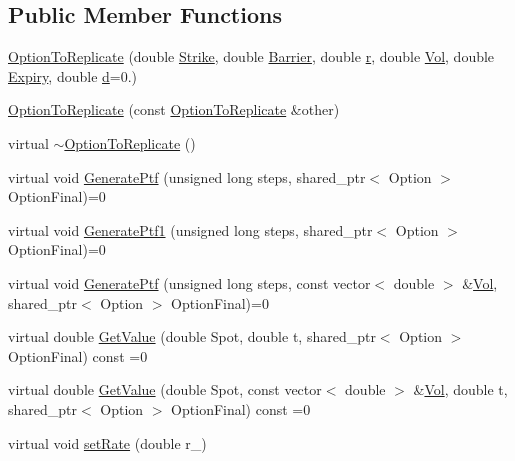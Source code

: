 \subsection*{Public Member Functions}
\begin{DoxyCompactItemize}
\item 
\hyperlink{classOptionToReplicate_a0fd76dc048a75371e306275fdd5a2aa5}{Option\+To\+Replicate} (double \hyperlink{classOptionToReplicate_a64ffcbc25fc60c5dc18ca4b78194ca89}{Strike}, double \hyperlink{classOptionToReplicate_a7cd35379de855ad6e53008fbf7e9dda0}{Barrier}, double \hyperlink{classOptionToReplicate_ad344ef3a4a4e93372c390c60420d1a61}{r}, double \hyperlink{classOptionToReplicate_a3a28b1ab0cd1ee635b3c31998bd2c572}{Vol}, double \hyperlink{classOptionToReplicate_a62014eac88a2a766ed674be69e9fd926}{Expiry}, double \hyperlink{classOptionToReplicate_aa088a512c974dc622ca1bbca61ec5e34}{d}=0.)
\item 
\hyperlink{classOptionToReplicate_a94d108f85fbd72b41d68f5e22061d0c5}{Option\+To\+Replicate} (const \hyperlink{classOptionToReplicate}{Option\+To\+Replicate} \&other)
\item 
virtual \hyperlink{classOptionToReplicate_a215ec3a4ce1dd20524ee87c663e8ed74}{$\sim$\+Option\+To\+Replicate} ()
\item 
virtual void \hyperlink{classOptionToReplicate_ae744ce948286546566cd424eaa7ea5cb}{Generate\+Ptf} (unsigned long steps, shared\+\_\+ptr$<$ Option $>$ Option\+Final)=0
\item 
virtual void \hyperlink{classOptionToReplicate_ad3315e5766faa9be46fa690d8d358b9d}{Generate\+Ptf1} (unsigned long steps, shared\+\_\+ptr$<$ Option $>$ Option\+Final)=0
\item 
virtual void \hyperlink{classOptionToReplicate_a47ad183412648a70cd77957383eb421f}{Generate\+Ptf} (unsigned long steps, const vector$<$ double $>$ \&\hyperlink{classOptionToReplicate_a3a28b1ab0cd1ee635b3c31998bd2c572}{Vol}, shared\+\_\+ptr$<$ Option $>$ Option\+Final)=0
\item 
virtual double \hyperlink{classOptionToReplicate_a7f39f64594b4baffb45d61a65b38c6b2}{Get\+Value} (double Spot, double t, shared\+\_\+ptr$<$ Option $>$ Option\+Final) const =0
\item 
virtual double \hyperlink{classOptionToReplicate_a738f813473de4945df377bcd3fe17f6e}{Get\+Value} (double Spot, const vector$<$ double $>$ \&\hyperlink{classOptionToReplicate_a3a28b1ab0cd1ee635b3c31998bd2c572}{Vol}, double t, shared\+\_\+ptr$<$ Option $>$ Option\+Final) const =0
\item 
virtual void \hyperlink{classOptionToReplicate_ac93d01199a0c2dfcfedb6185d6f0de2f}{set\+Rate} (double r\+\_\+)
\end{DoxyCompactItemize}
